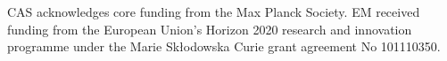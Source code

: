 \documentclass[gmd, manuscript]{copernicus}
\begin{document}


\appendixfigures  %

\appendixtables   %


\clearpage




\begin{acknowledgements}
CAS acknowledges core funding from the Max Planck Society. EM received funding from the European Union’s Horizon 2020 research and innovation programme under the Marie Skłodowska Curie grant agreement No 101110350. 
\end{acknowledgements}






%
%
%

 
 
\end{document}
